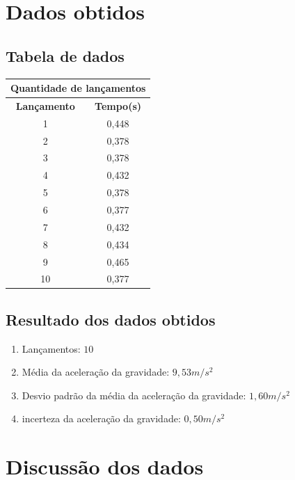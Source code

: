 \documentclass[a4paper]{article}
\begin{document}
\section{Dados obtidos}

\subsection{Tabela de dados}
\begin{center}
    \begin{tabular}{ |c|c| }
        \hline
        \multicolumn{2}{|c|}{Quantidade de lançamentos} \\

        \hline
        \textbf{Lançamento} & \textbf{Tempo(s)} \\ [0.5ex]
        \hline
        1 & 0,448 \\
        \hline
        2 & 0,378 \\
        \hline
        3 & 0,378 \\
        \hline
        4 & 0,432 \\
        \hline
        5 & 0,378 \\
        \hline
        6 & 0,377 \\
        \hline
        7 & 0,432 \\
        \hline
        8 & 0,434 \\
        \hline
        9 & 0,465 \\
        \hline
        10 & 0,377 \\
        \hline
    \end{tabular}
\end{center}

\subsection{Resultado dos dados obtidos}
\begin{enumerate}
    \item Lançamentos: $ 10 $
    \item Média da aceleração da gravidade: $ 9,53 m/s^2 $
    \item Desvio padrão da média da aceleração da gravidade: $ 1,60 m/s^2 $
    \item incerteza da aceleração da gravidade: $ 0,50 m/s^2 $
\end{enumerate}

\section{Discussão dos dados}
\end{document}
